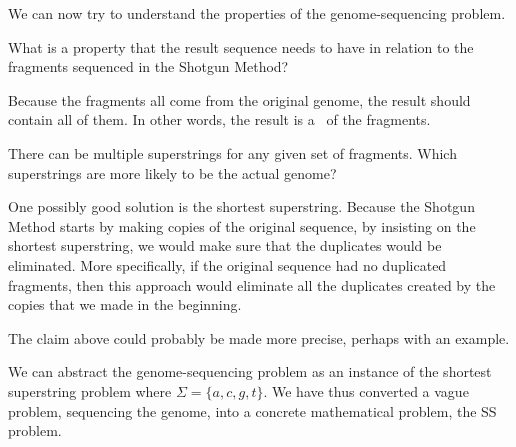 \begin{gram} 
We can now try to understand the properties of the genome-sequencing
problem.
\end{gram}

\begin{cflex}
\begin{exercise}
What is a property that the result sequence needs to have in relation
to the fragments sequenced in the Shotgun Method?
\end{exercise}

\begin{solution}
Because the fragments all come from the original genome, the result
should contain all of them.  In other words, the result is
a~ of the fragments.
%
\end{solution}
\end{cflex}

\begin{cflex}
\begin{exercise}
There can be multiple superstrings for any given set of fragments.
%
Which superstrings are more likely to be the actual genome?
%
\end{exercise}

\begin{solution}
One possibly good solution is the shortest superstring. 
%
Because the Shotgun Method starts by making copies of the original
sequence, by insisting on the shortest superstring, we would make sure
that the duplicates would be eliminated.
%
More specifically, if the original sequence had no duplicated
fragments, then this approach would eliminate all the duplicates
created by the copies that we made in the beginning.
%
%
\end{solution}
\end{cflex}

\begin{teachnote}
The claim above could probably be made more precise, perhaps with an
example.
\end{teachnote}



\begin{gram}
We can abstract the genome-sequencing problem as an instance of the
shortest superstring problem where $\Sigma = \{a, c, g, t\}$.
%
We have thus converted a vague problem, sequencing the genome, into a
concrete mathematical problem, the SS problem. 
%
\end{gram}

